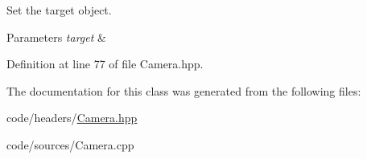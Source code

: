 Set the target object. 


\begin{DoxyParams}{Parameters}
{\em target} & \\
\hline
\end{DoxyParams}


Definition at line 77 of file Camera.\+hpp.



The documentation for this class was generated from the following files\+:\begin{DoxyCompactItemize}
\item 
code/headers/\mbox{\hyperlink{_camera_8hpp}{Camera.\+hpp}}\item 
code/sources/Camera.\+cpp\end{DoxyCompactItemize}
